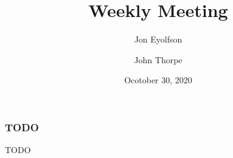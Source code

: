 

\title{Weekly Meeting}
\date{Ocotober 30, 2020}
\author{Jon Eyolfson \and John Thorpe}



  \begin{frame}[plain]
    \titlepage
  \end{frame}

  \setcounter{framenumber}{0}

  \begin{frame}
    \frametitle{TODO}

    TODO
  \end{frame}


